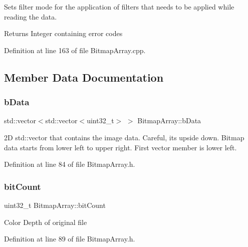 Sets filter mode for the application of filters that needs to be applied while reading the data. 

\begin{DoxyReturn}{Returns}
Integer containing error codes 
\end{DoxyReturn}


Definition at line 163 of file Bitmap\+Array.\+cpp.



\subsection{Member Data Documentation}
\mbox{\label{classBitmapArray_a4af158b9be17ce7ebeab8729c2b34ab2}} 
\subsubsection{\texorpdfstring{bData}{bData}}
{\footnotesize\ttfamily std\+::vector$<$std\+::vector$<$uint32\+\_\+t$>$ $>$ Bitmap\+Array\+::b\+Data\hspace{0.3cm}{\ttfamily [private]}}

2D std\+::vector that contains the image data. Careful, its upside down. Bitmap data starts from lower left to upper right. First vector member is lower left. 

Definition at line 84 of file Bitmap\+Array.\+h.

\mbox{\label{classBitmapArray_a18127e27d4b1477fd46ef0c0b3dbc110}} 
\subsubsection{\texorpdfstring{bitCount}{bitCount}}
{\footnotesize\ttfamily uint32\+\_\+t Bitmap\+Array\+::bit\+Count\hspace{0.3cm}{\ttfamily [private]}}

Color Depth of original file 

Definition at line 89 of file Bitmap\+Array.\+h.

\mbox{\label{classBitmapArray_abcab200a1eb84331f7c79702e9199694}} 
